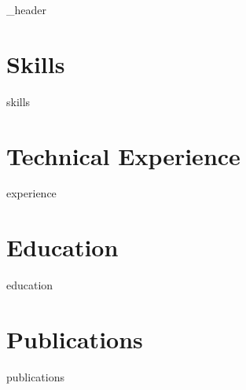 \documentclass{article}
\author{Noah S. Miller} %
\begin{document}
{_header}
\section{Skills}
{skills}

\section{Technical Experience}
{experience}

\section{Education}
{education}

\section{Publications}
{publications}

\end{document}
